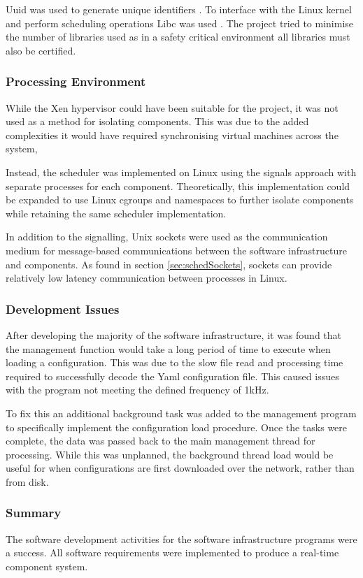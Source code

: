 Uuid was used to generate unique identifiers \autocite{uuid-rsUuidrsUuid2024}. To interface with the Linux kernel and perform scheduling operations Libc was used \autocite{rust-langRustlangLibc2024}. The project tried to minimise the number of libraries used as in a safety critical environment all libraries must also be certified.

\subsubsection{Processing Environment}
While the Xen hypervisor could have been suitable for the project, it was not used as a method for isolating components. This was due to the added complexities it would have required synchronising virtual machines across the system, 

Instead, the scheduler was implemented on Linux using the signals approach with separate processes for each component. Theoretically, this implementation could be expanded to use Linux cgroups and namespaces to further isolate components while retaining the same scheduler implementation.

In addition to the signalling, Unix sockets were used as the communication medium for message-based communications between the software infrastructure and components. As found in section \ref{sec:schedSockets}, sockets can provide relatively low latency communication between processes in Linux.

\subsubsection{Development Issues}
After developing the majority of the software infrastructure, it was found that the management function would take a long period of time to execute when loading a configuration. This was due to the slow file read and processing time required to successfully decode the Yaml configuration file. This caused issues with the program not meeting the defined frequency of 1kHz.

To fix this an additional background task was added to the management program to specifically implement the configuration load procedure. Once the tasks were complete, the data was passed back to the main management thread for processing. While this was unplanned, the background thread load would be useful for when configurations are first downloaded over the network, rather than from disk.

\subsubsection{Summary}
The software development activities for the software infrastructure programs were a success. All software requirements were implemented to produce a real-time component system.

